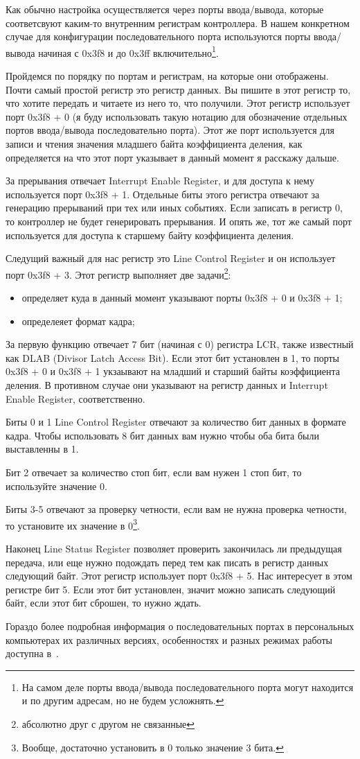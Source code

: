 Как обычно настройка осуществляется через порты ввода/вывода, которые
соответсвуют каким-то внутренним регистрам контроллера. В нашем конкретном
случае для конфигурации последовательного порта используются порты ввода/вывода
начиная с 0x3f8 и до 0x3ff включительно\footnote{На самом деле порты
ввода/вывода последовательного порта могут находится и по другим адресам, но не
будем усложнять.}.

Пройдемся по порядку по портам и регистрам, на которые они отображены. Почти
самый простой регистр это регистр данных. Вы пишите в этот регистр то, что
хотите передать и читаете из него то, что получили. Этот регистр использует порт
0x3f8 + 0 (я буду использовать такую нотацию для обозначение отдельных портов
ввода/вывода последовательно порта). Этот же порт используется для записи и
чтения значения младшего байта коэффициента деления, как определяется на что
этот порт указывает в данный момент я расскажу дальше.

За прерывания отвечает Interrupt Enable Register, и для доступа к нему
используется порт 0x3f8 + 1. Отдельные биты этого регистра отвечают за
генерацию прерываний при тех или иных событиях. Если записать в регистр 0, то
контроллер не будет генерировать прерывания. И опять же, тот же самый порт
используется для доступа к старшему байту коэффициента деления.

Следущий важный для нас регистр это Line Control Register и он использует порт
0x3f8 + 3. Этот регистр выполняет две задачи\footnote{абсолютно друг с другом
не связанные}:
\begin{itemize}
  \item определяет куда в данный момент указывают порты 0x3f8 + 0 и 0x3f8 + 1;
  \item определеяет формат кадра;
\end{itemize}

За первую функцию отвечает 7 бит (начиная с 0) регистра LCR, также известный как
DLAB (Divisor Latch Access Bit). Если этот бит установлен в 1, то порты
0x3f8 + 0 и 0x3f8 + 1 укзаывают на младший и старший байты коэффициента деления.
В противном случае они указывают на регистр данных и Interrupt Enable Register,
соответственно.

Биты 0 и 1 Line Control Register отвечают за количество бит данных в формате
кадра. Чтобы использовать 8 бит данных вам нужно чтобы оба бита были выставленны
в 1.

Бит 2 отвечает за количество стоп бит, если вам нужен 1 стоп бит, то используйте
значение 0.

Биты 3-5 отвечают за проверку четности, если вам не нужна проверка четности, то
установите их значение в 0\footnote{Вообще, достаточно установить в 0 только
значение 3 бита.}.

Наконец Line Status Register позволяет проверить закончилась ли предыдущая
передача, или еще нужно подождать перед тем как писать в регистр данных
следующий байт. Этот регистр использует порт 0x3f8 + 5. Нас интересует в этом
регистре бит 5. Если этот бит установлен, значит можно записать следующий байт,
если этот бит сброшен, то нужно ждать.

Гораздо более подробная информация о последовательных портах в персональных
компьютерах их различных версиях, особенностях и разных режимах работы доступна
в~\cite{SERIAL}.
